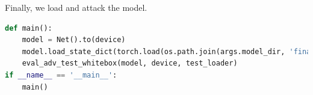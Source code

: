 Finally, we load and attack the model.
\begin{lstlisting}[language=Python]
def main():
    model = Net().to(device)
    model.load_state_dict(torch.load(os.path.join(args.model_dir, 'final_model.pt')))
    eval_adv_test_whitebox(model, device, test_loader)
if __name__ == '__main__':
    main()
\end{lstlisting}











